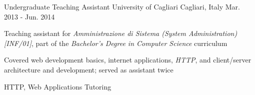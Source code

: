 \begin{cventries}
    \cventrywithdoubletags
    	{Undergraduate Teaching Assistant} %
    	{University of Cagliari } %
    	{Cagliari, Italy} %
    	{Mar. 2013 - Jun. 2014} %
    	{
			\begin{cvitems} %
				\item Teaching assistant for \textit{Amministrazione di Sistema (System Administration) [INF/01]}, part of the \textit{Bachelor's Degree in Computer Science} curriculum
				\item Covered web development basics, internet applications, \textit{HTTP}, and client/server architecture and development; served as assistant twice
			\end{cvitems}
        }
        {HTTP, Web Applications}
        {Tutoring}
    

\end{cventries}